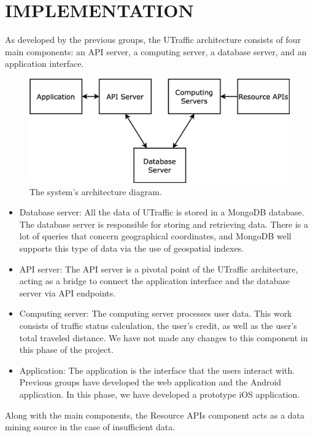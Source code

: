 %
%
\section{IMPLEMENTATION}
\label{section:implementation}

As developed by the previous groups, the UTraffic architecture consists of four main components: an API server, a computing server, a database server, and an application interface. 

\begin{figure}[H]
    \centering
    \includegraphics[width=\textwidth]{assets/images/Implementation/system_architecture_diagram.png}
    \caption{The system's architecture diagram.}
    \label{fig:utraffic_architecture}
\end{figure}

\begin{itemize}
    \item Database server: All the data of UTraffic is stored in a MongoDB database. The database server is responsible for storing and retrieving data. There is a lot of queries that concern geographical coordinates, and MongoDB well supports this type of data via the use of geospatial indexes.
    \item API server: The API server is a pivotal point of the UTraffic architecture, acting as a bridge to connect the application interface and the database server via API endpoints.
    \item Computing server: The computing server processes user data. This work consists of traffic status calculation, the user's credit, as well as the user's total traveled distance. We have not made any changes to this component in this phase of the project.
    \item Application: The application is the interface that the users interact with. Previous groups have developed the web application and the Android application. In this phase, we have developed a prototype iOS application.
\end{itemize}
Along with the main components, the Resource APIs component acts as a data mining source in the case of insufficient data. 

